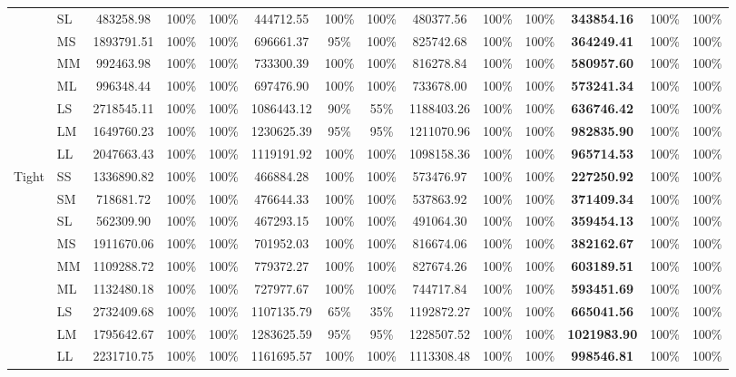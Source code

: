 \documentclass[journal]{IEEEtran}
\begin{document}
\begin{table}[!t]
\begin{tabular*}{\textwidth}{@{\extracolsep{\fill}}ll*{4}{ccc}@{}}
 & SL & 483258.98 & 100\% & 100\% & 444712.55 & 100\% & 100\% & 480377.56 & 100\% & 100\% & \textbf{343854.16} & 100\% & 100\% \\
 & MS & 1893791.51 & 100\% & 100\% & 696661.37 & 95\% & 100\% & 825742.68 & 100\% & 100\% & \textbf{364249.41} & 100\% & 100\% \\
 & MM & 992463.98 & 100\% & 100\% & 733300.39 & 100\% & 100\% & 816278.84 & 100\% & 100\% & \textbf{580957.60} & 100\% & 100\% \\
 & ML & 996348.44 & 100\% & 100\% & 697476.90 & 100\% & 100\% & 733678.00 & 100\% & 100\% & \textbf{573241.34} & 100\% & 100\% \\
 & LS & 2718545.11 & 100\% & 100\% & 1086443.12 & 90\% & 55\% & 1188403.26 & 100\% & 100\% & \textbf{636746.42} & 100\% & 100\% \\
 & LM & 1649760.23 & 100\% & 100\% & 1230625.39 & 95\% & 95\% & 1211070.96 & 100\% & 100\% & \textbf{982835.90} & 100\% & 100\% \\
 & LL & 2047663.43 & 100\% & 100\% & 1119191.92 & 100\% & 100\% & 1098158.36 & 100\% & 100\% & \textbf{965714.53} & 100\% & 100\% \\
\midrule
Tight & SS & 1336890.82 & 100\% & 100\% & 466884.28 & 100\% & 100\% & 573476.97 & 100\% & 100\% & \textbf{227250.92} & 100\% & 100\% \\
 & SM & 718681.72 & 100\% & 100\% & 476644.33 & 100\% & 100\% & 537863.92 & 100\% & 100\% & \textbf{371409.34} & 100\% & 100\% \\
 & SL & 562309.90 & 100\% & 100\% & 467293.15 & 100\% & 100\% & 491064.30 & 100\% & 100\% & \textbf{359454.13} & 100\% & 100\% \\
 & MS & 1911670.06 & 100\% & 100\% & 701952.03 & 100\% & 100\% & 816674.06 & 100\% & 100\% & \textbf{382162.67} & 100\% & 100\% \\
 & MM & 1109288.72 & 100\% & 100\% & 779372.27 & 100\% & 100\% & 827674.26 & 100\% & 100\% & \textbf{603189.51} & 100\% & 100\% \\
 & ML & 1132480.18 & 100\% & 100\% & 727977.67 & 100\% & 100\% & 744717.84 & 100\% & 100\% & \textbf{593451.69} & 100\% & 100\% \\
 & LS & 2732409.68 & 100\% & 100\% & 1107135.79 & 65\% & 35\% & 1192872.27 & 100\% & 100\% & \textbf{665041.56} & 100\% & 100\% \\
 & LM & 1795642.67 & 100\% & 100\% & 1283625.59 & 95\% & 95\% & 1228507.52 & 100\% & 100\% & \textbf{1021983.90} & 100\% & 100\% \\
 & LL & 2231710.75 & 100\% & 100\% & 1161695.57 & 100\% & 100\% & 1113308.48 & 100\% & 100\% & \textbf{998546.81} & 100\% & 100\% \\
\bottomrule
\end{tabular*}
\end{table}
\end{document}
